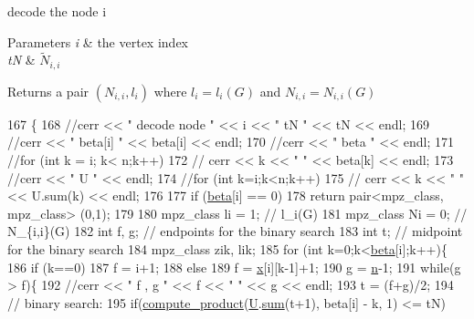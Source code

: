 decode the node i 


\begin{DoxyParams}{Parameters}
{\em i} & the vertex index \\
\hline
{\em tN} & $\tilde{N}_{i,i}$ \\
\hline
\end{DoxyParams}
\begin{DoxyReturn}{Returns}
a pair $(N_{i,i}, l_i)$ where $l_i = l_i(G)$ and $N_{i,i} = N_{i,i}(G)$ 
\end{DoxyReturn}

\begin{DoxyCode}
167 \{
168   \textcolor{comment}{//cerr << " decode node " << i << " tN " << tN << endl;}
169   \textcolor{comment}{//cerr << " beta[i] " << beta[i] << endl;}
170   \textcolor{comment}{//cerr << " beta " << endl;}
171   \textcolor{comment}{//for (int k = i; k< n;k++)}
172   \textcolor{comment}{//  cerr << k << " " << beta[k] << endl;}
173   \textcolor{comment}{//cerr << " U " << endl;}
174   \textcolor{comment}{//for (int k=i;k<n;k++)}
175   \textcolor{comment}{//  cerr << k << " " << U.sum(k) << endl;}
176 
177   \textcolor{keywordflow}{if} (\hyperlink{classgraph__decoder_aa57c11e4c09c52101682ff83286162f7}{beta}[i] == 0)
178     \textcolor{keywordflow}{return} pair<mpz\_class, mpz\_class> (0,1);
179 
180   mpz\_class li = 1; \textcolor{comment}{// l\_i(G)}
181   mpz\_class Ni = 0; \textcolor{comment}{// N\_\{i,i\}(G)}
182   \textcolor{keywordtype}{int} f, g; \textcolor{comment}{// endpoints for the binary search}
183   \textcolor{keywordtype}{int} t; \textcolor{comment}{// midpoint for the binary search}
184   mpz\_class zik, lik; 
185   \textcolor{keywordflow}{for} (\textcolor{keywordtype}{int} k=0;k<\hyperlink{classgraph__decoder_aa57c11e4c09c52101682ff83286162f7}{beta}[i];k++)\{
186     \textcolor{keywordflow}{if} (k==0)
187       f = i+1;
188     \textcolor{keywordflow}{else}
189       f = \hyperlink{classgraph__decoder_aa3f2776afe387668cf7f68109428e14e}{x}[i][k-1]+1;
190     g = \hyperlink{classgraph__decoder_a6bc1e72b2f7a913d14b789a6c2d92c1e}{n}-1;
191     \textcolor{keywordflow}{while}(g > f)\{
192       \textcolor{comment}{//cerr << " f , g " << f << " " << g << endl;}
193       t = (f+g)/2;
194       \textcolor{comment}{// binary search:}
195       \textcolor{keywordflow}{if}(\hyperlink{compression__helper_8cpp_ae2afb43aabe50f7d42aae8f82b5a35f4}{compute\_product}(\hyperlink{classgraph__decoder_a2fa9fec2cef06aaa410e57fb59d5c1ad}{U}.\hyperlink{classreverse__fenwick__tree_a672731fd6395b4853430073a099a80e6}{sum}(t+1), beta[i] - k, 1) <= tN)

\end{DoxyCode}
